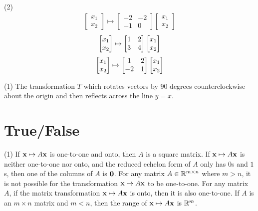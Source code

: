 \begin{tasks}[resume, style=enumerate](2)
\task
  \begin{align*}
    \begin{bmatrix} x_1 \\ x_2 \end{bmatrix}
    \mapsto
    \begin{bmatrix}
      -2 & -2 \\
      -1 & 0
    \end{bmatrix}
    \begin{bmatrix} x_1 \\ x_2 \end{bmatrix}
  \end{align*}
\task
\begin{displaymath}
   \begin{bmatrix} x_1 \\ x_2 \end{bmatrix} 
  \mapsto
  \begin{bmatrix}
    1 & 2 \\
    3 & 4
  \end{bmatrix}
   \begin{bmatrix} x_1 \\ x_2 \end{bmatrix} 
\end{displaymath}
\task
\begin{displaymath}
   \begin{bmatrix} x_1 \\ x_2 \end{bmatrix} 
  \mapsto
  \begin{bmatrix}
    1 & 2 \\
    -2 & 1
  \end{bmatrix}
   \begin{bmatrix} x_1 \\ x_2 \end{bmatrix} 
\end{displaymath}
\end{tasks}
\begin{tasks}[resume, style=enumerate](1)
\task The transformation $T$ which rotates vectors by 90 degrees
  counterclockwise about the origin and then reflects across the line
  $y = x$.
\end{tasks}

\section{True/False}

\trueFalseHeader

\begin{tasks}[resume, style=enumerate](1)
\task
  If $\mathbf x \mapsto A \mathbf x$ is one-to-one and onto, then $A$ is a square
  matrix.
\task
  If $\mathbf x \mapsto A \mathbf x$ is neither one-to-one nor onto, and the
  reduced echelon form of $A$ only has $0$s and $1$s, then one of the
  columns of $A$ is $\mathbf 0$.
\task
  For any matrix $A \in \mathbb R^{m \times n}$ where $m > n$, it is not
  possible for the transformation $\mathbf x \mapsto A \mathbf x$ to be
  one-to-one.
\task
  For any matrix $A$, if the matrix transformation $\mathbf x \mapsto A \mathbf x$
  is onto, then it is also one-to-one.
\task
  If $A$ is an $m \times n$ matrix and $m < n$, then the range of
  $\mathbf x \mapsto A\mathbf x$ is $\mathbb R^m$.
\end{tasks}


